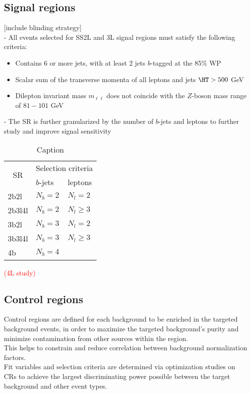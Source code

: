 \documentclass[../thesis.tex]{subfiles}
\begin{document}
\subsection{Signal regions}
[include blinding strategy]\\
- All events selected for SS2L and 3L signal regions must satisfy the following criteria:
\begin{itemize}
\item Contains 6 or more jets, with at least 2 jets $b$-tagged at the 85\% WP
\item Scalar sum of the transverse momenta of all leptons and jets $\HT > 500$ GeV
\item Dilepton invariant mass $m_{\ell\ell}$ does not coincide with the $Z$-boson mass range of $81-101$ GeV
\end{itemize}
- The SR is further granularized by the number of $b$-jets and leptons to further study and improve signal sensitivity\\

\begin{table}[!ht]
\centering
\begin{tabular}{p{2cm}|p{3cm}l}
\toprule\toprule
\multicolumn{1}{c|}{\multirow{ 2}{*}{SR}} & \multicolumn{2}{c}{Selection criteria} \\
\multicolumn{1}{c|}{}					  & $b$-jets	& leptons \\
\midrule
2b2l			& $N_b = 2$	& $N_l = 2$\\
2b3l4l			& $N_b = 2$	& $N_l \geq 3$\\
3b2l			& $N_b = 3$	& $N_l = 2$\\
3b3l4l			& $N_b = 3$	& $N_l \geq 3$\\
4b				& $N_b = 4$	& \\
\bottomrule\bottomrule
\end{tabular}
\caption{\label{tab:ana:SR}Caption}%
\end{table}

\textcolor{red}{(4L study)}

\subsection{Control regions}
Control regions are defined for each background to be enriched in the targeted background events, in order to maximize the targeted background's purity and minimize contamination from other sources within the region.\\
This helps to constrain and reduce correlation between background normalization factors.\\
Fit variables and selection criteria are determined via optimization studies on CRs to achieve the largest discriminating power possible between the target background and other event types.
\end{document}
